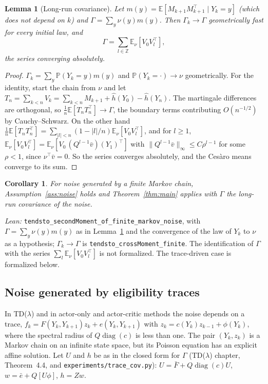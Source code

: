 \documentclass[11pt]{article}
\newtheorem{lemma}[theorem]{Lemma}
\newtheorem{corollary}[theorem]{Corollary}
\theoremstyle{definition}
\theoremstyle{remark}
\newcommand{\E}{\mathbb{E}}
\begin{document}
\begin{lemma}[Long-run covariance]\label{lem:lrc}
Let $m(y) = \E[M_{k+1}M_{k+1}^\top\mid Y_k = y]$ (which does not depend on $k$) and
$\Gamma = \sum_y\nu(y)m(y)$. Then $\Gamma_k \to \Gamma$ geometrically fast for every
initial law, and
\[
  \Gamma = \sum_{l\in\mathbb Z}\E_\nu[V_0V_l^\top],
\]
the series converging absolutely.
\end{lemma}
\begin{proof}
$\Gamma_k = \sum_y\mathbb P(Y_k = y)m(y)$ and $\mathbb P(Y_k = \cdot) \to \nu$ geometrically.
For the identity, start the chain from $\nu$ and let $T_n = \sum_{k<n}V_k
= \sum_{k<n}M_{k+1} + \hat h(Y_0) - \hat h(Y_n)$. The martingale differences are
orthogonal, so $\frac1n\E[T_nT_n^\top] \to \Gamma$, the boundary terms contributing
$O(n^{-1/2})$ by Cauchy--Schwarz. On the other hand
$\frac1n\E[T_nT_n^\top] = \sum_{|l|<n}(1 - |l|/n)\E_\nu[V_0V_l^\top]$, and for $l \ge 1$,
$\E_\nu[V_0V_l^\top] = \E_\nu[V_0\,(Q^{l-1}\bar v)(Y_1)^\top]$ with
$\|Q^{l-1}\bar v\|_\infty \le C\rho^{l-1}$ for some $\rho < 1$, since $\nu^\top\bar v = 0$.
So the series converges absolutely, and the Ces\`aro means converge to its sum.
\end{proof}

\begin{corollary}\label{cor:finite}
For noise generated by a finite Markov chain, Assumption~\ref{ass:noise} holds and
Theorem~\ref{thm:main} applies with $\Gamma$ the long-run covariance of the noise.
\end{corollary}
\noindent\emph{Lean:} \texttt{tendsto\_secondMoment\_of\_finite\_markov\_noise}, with
$\Gamma = \sum_y\nu(y)m(y)$ as in Lemma~\ref{lem:lrc} and the convergence of the law of $Y_k$ to
$\nu$ as a hypothesis; $\Gamma_k \to \Gamma$ is \texttt{tendsto\_crossMoment\_finite}. The
identification of $\Gamma$ with the series $\sum_l\E_\nu[V_0V_l^\top]$ is not formalized. The trace-driven
case is formalized below.

\subsection{Noise generated by eligibility traces}

In TD($\lambda$) and in actor-only and actor-critic methods the noise depends on a trace,
$f_k = F(Y_k,Y_{k+1})z_k + e(Y_k,Y_{k+1})$ with $z_k = c(Y_k)z_{k-1} + \phi(Y_k)$, where the
spectral radius of $Q\operatorname{diag}(c)$ is less than one. The pair $(Y_k, z_k)$ is a
Markov chain on an infinite state space, but its Poisson equation has an explicit
affine solution. Let $U$ and $h$ be as in the closed form for $\Gamma$ (TD($\lambda$) chapter,
Theorem~4.4, and \texttt{experiments/trace\_cov.py}):
$U = \bar F + Q\operatorname{diag}(c)U$, $w = \bar e + Q[U\phi]$, $h = Zw$.
\end{document}
